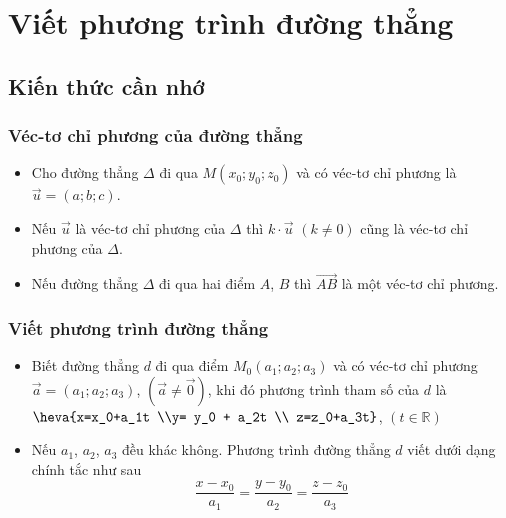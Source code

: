 \setcounter{section}{35}
\setcounter{ex}{0}
\section{Viết phương trình đường thẳng}
\subsection{Kiến thức cần nhớ}
\begin{khung}
	\subsubsection{Véc-tơ chỉ phương của đường thẳng}
	\begin{itemize}
\item  Cho đường thẳng $\Delta$ đi qua $M(x_0;y_0;z_0)$ và có véc-tơ chỉ phương là $\vec{u}=(a;b;c)$.
\item Nếu $\vec{u}$ là véc-tơ chỉ phương của $\Delta$ thì $k\cdot\vec{u}$ $(k\ne 0)$ cũng là véc-tơ chỉ phương của $\Delta$.
\item Nếu đường thẳng $\Delta$ đi qua hai điểm $A$, $B$ thì $\overrightarrow{AB}$ là một véc-tơ chỉ phương.
	\end{itemize}
	\subsubsection{Viết phương trình đường thẳng}
	\begin{itemize}
\item Biết đường thẳng $d$ đi qua điểm $M_0(a_1;a_2;a_3)$ và có véc-tơ chỉ phương $\vec{a}=(a_1;a_2;a_3)$, $(\vec{a}\neq \vec{0})$, khi đó phương trình tham số của $d$ là $\heva{x=x_0+a_1t \\y= y_0 + a_2t \\ z=z_0+a_3t}$, $(t\in\mathbb{R})$
\item Nếu $a_1$, $a_2$, $a_3$ đều khác không. Phương trình đường thẳng $d$ viết dưới dạng chính tắc như sau
\[\dfrac{x-x_0}{a_1}=\dfrac{y-y_0}{a_2}=\dfrac{z-z_0}{a_3}\]
	\end{itemize}
\end{khung}
